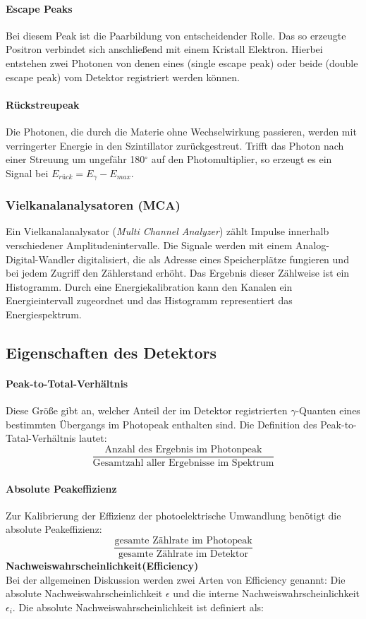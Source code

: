 \documentclass[ngerman,11pt]{article}
\begin{document}
\begin{multicols}{2}
		\paragraph{Escape Peaks}
		Bei diesem Peak ist die Paarbildung von entscheidender Rolle. Das so erzeugte Positron verbindet sich anschließend mit einem Kristall Elektron. Hierbei entstehen zwei Photonen von denen eines (single escape peak) oder beide (double escape peak) vom Detektor registriert werden können.
		\paragraph{Rückstreupeak}
		Die Photonen, die durch die Materie ohne Wechselwirkung passieren, werden mit verringerter Energie in den Szintillator zurückgestreut. Trifft das Photon nach einer Streuung um ungefähr 180$^{\circ}$ auf den Photomultiplier, so erzeugt es ein Signal bei $E_{rück}=E_\gamma-E_{max}$.

		\subsubsection{Vielkanalanalysatoren (MCA)}

		Ein Vielkanalanalysator (\textit{Multi Channel Analyzer}) zählt Impulse innerhalb verschiedener Amplitudenintervalle. Die Signale werden mit einem Analog-Digital-Wandler digitalisiert,  die als Adresse eines Speicherplätze fungieren und bei jedem Zugriff den Zählerstand erhöht. Das Ergebnis dieser Zählweise ist ein Histogramm. Durch eine Energiekalibration kann den Kanalen ein Energieintervall zugeordnet und das Histogramm representiert das Energiespektrum. \cite{messelektronik}

		\subsection{Eigenschaften des Detektors}

		\paragraph{Peak-to-Total-Verhältnis}
		Diese Größe gibt an, welcher Anteil der im Detektor registrierten  $\gamma$-Quanten eines bestimmten Übergangs im Photopeak enthalten sind. Die Definition des Peak-to-Tatal-Verhältnis lautet:
		\[
		\dfrac{\text{Anzahl des Ergebnis~im~Photonpeak}}{\text{Gesamtzahl~aller Ergebnisse~im~Spektrum}}
		\]
		\paragraph{Absolute Peakeffizienz}
		Zur Kalibrierung der Effizienz der photoelektrische Umwandlung benötigt die absolute Peakeffizienz: \cite{techniques}
		\[
		\dfrac{\text{gesamte Zählrate im Photopeak}}{\text{gesamte Zählrate im Detektor}}
		\]
		\textbf{Nachweiswahrscheinlichkeit(Efficiency)}\\
		Bei der allgemeinen Diskussion werden zwei Arten von Efficiency genannt: Die absolute Nachweiswahrscheinlichkeit $\epsilon$ und die interne Nachweiswahrscheinlichkeit $\epsilon_i$. Die absolute Nachweiswahrscheinlichkeit ist definiert als: \cite{techniques}


\end{multicols}
\end{document}
